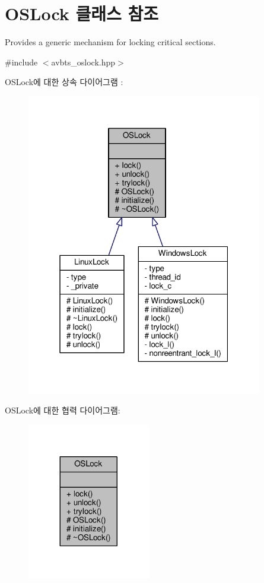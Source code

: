 \hypertarget{class_o_s_lock}{}\section{O\+S\+Lock 클래스 참조}
\label{class_o_s_lock}


Provides a generic mechanism for locking critical sections.  




{\ttfamily \#include $<$avbts\+\_\+oslock.\+hpp$>$}



O\+S\+Lock에 대한 상속 다이어그램 \+: 
\nopagebreak
\begin{figure}[H]
\begin{center}
\leavevmode
\includegraphics[width=292pt]{class_o_s_lock__inherit__graph}
\end{center}
\end{figure}


O\+S\+Lock에 대한 협력 다이어그램\+:
\nopagebreak
\begin{figure}[H]
\begin{center}
\leavevmode
\includegraphics[width=152pt]{class_o_s_lock__coll__graph}
\end{center}
\end{figure}
